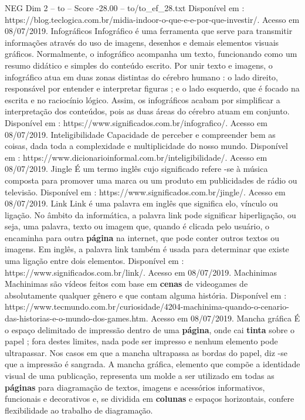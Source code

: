 \begin{textsample}{NEG Dim 2 – to – Score -28.00 – to/to\_ef\_28.txt}
Disponível em : https://blog.teclogica.com.br/midia-indoor-o-que-e-e-por-que-investir/.
Acesso em 08/07/2019.
Infográficos Infográfico é uma ferramenta que serve para transmitir informações através do uso de imagens, desenhos e demais elementos visuais gráficos.
Normalmente, o infográfico acompanha um texto, funcionando como um resumo didático e simples do conteúdo escrito.
Por unir texto e imagens, o infográfico atua em duas zonas distintas do cérebro humano : o lado direito, responsável por entender e interpretar figuras ; e o lado esquerdo, que é focado na escrita e no raciocínio lógico.
Assim, os infográficos acabam por simplificar a interpretação dos conteúdos, pois as duas áreas do cérebro atuam em conjunto.
Disponível em : https://www.significados.com.br/infografico/.
Acesso em 08/07/2019.
Inteligibilidade Capacidade de perceber e compreender bem as coisas, dada toda a complexidade e multiplicidade do nosso mundo.
Disponível em : https://www.dicionarioinformal.com.br/inteligibilidade/.
Acesso em 08/07/2019.
Jingle É um termo inglês cujo significado refere -se à música composta para promover uma marca ou um produto em publicidades de rádio ou televisão.
Disponível em : https://www.significados.com.br/jingle/.
Acesso em 08/07/2019.
Link Link é uma palavra em inglês que significa elo, vínculo ou ligação.
No âmbito da informática, a palavra link pode significar hiperligação, ou seja, uma palavra, texto ou imagem que, quando é clicada pelo usuário, o encaminha para outra \textbf{página} na internet, que pode conter outros textos ou imagens.
Em inglês, a palavra link também é usada para determinar que existe uma ligação entre dois elementos.
Disponível em : https://www.significados.com.br/link/.
Acesso em 08/07/2019.
Machinimas Machinimas são vídeos feitos com base em \textbf{cenas} de videogames de absolutamente qualquer gênero e que contam alguma história.
Disponível em : https://www.tecmundo.com.br/curiosidade/4204-machinima-quando-o-cenario-das-historias-e-o-mundo-dos-games.htm.
Acesso em 08/07/2019.
Mancha gráfica É o espaço delimitado de impressão dentro de uma \textbf{página}, onde cai \textbf{tinta} sobre o papel ; fora destes limites, nada pode ser impresso e nenhum elemento pode ultrapassar.
Nos casos em que a mancha ultrapassa as bordas do papel, diz -se que a impressão é sangrada.
A mancha gráfica, elemento que compõe a identidade visual de uma publicação, representa um molde a ser utilizado em todas as \textbf{páginas} para diagramação de textos, imagens e acessórios informativos, funcionais e decorativos e, se dividida em \textbf{colunas} e espaços horizontais, confere flexibilidade ao trabalho de diagramação.

\end{textsample}
